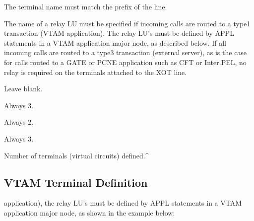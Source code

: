 \documentclass[letterpaper,10pt,english]{sphinxmanual}
\begin{document}
\sphinxAtStartPar
{}

\sphinxAtStartPar
{}
\begin{description}
\sphinxAtStartPar
The terminal name must match the prefix of the line.

\sphinxAtStartPar
The name of a relay LU must be specified if incoming calls are
routed to a type\sphinxhyphen{}1 transaction (VTAM application). The relay LU’s
must be defined by APPL statements in a VTAM application major node,
as described below. If all incoming calls are routed to a type\sphinxhyphen{}3
transaction (external server), as is the case for calls routed to a
GATE or PCNE application such as CFT or Inter.PEL, no relay is
required on the terminals attached to the XOT line.

\sphinxAtStartPar
Leave blank.

\sphinxAtStartPar
Always 3.

\sphinxAtStartPar
Always 2.

\sphinxAtStartPar
Always 3.

\sphinxAtStartPar
Number of terminals (virtual circuits) defined.\textasciicircum{}

\end{description}

\ignorespaces 

\subsection{VTAM Terminal Definition}
\label{\detokenize{connectivity_guide:vtam-terminal-definition}}\label{\detokenize{connectivity_guide:index-54}}\begin{description}
\sphinxAtStartPar
application), the relay LU’s must be defined by APPL statements in a
VTAM application major node, as shown in the example below:

\end{description}
\end{document}
